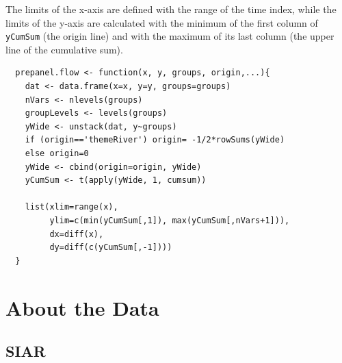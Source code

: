 \documentclass[smallroyalvopaper]{memoir}
\begin{document}
The limits of the x-axis are defined with the range of the time index,
while the limits of the y-axis are calculated with the minimum of the
first column of \texttt{yCumSum} (the origin line) and with the maximum of
its last column (the upper line of the cumulative sum).

\lstset{language=r,label= ,caption= ,captionpos=b,numbers=none}
\begin{lstlisting}
  prepanel.flow <- function(x, y, groups, origin,...){
    dat <- data.frame(x=x, y=y, groups=groups)
    nVars <- nlevels(groups)
    groupLevels <- levels(groups)
    yWide <- unstack(dat, y~groups)
    if (origin=='themeRiver') origin= -1/2*rowSums(yWide)
    else origin=0
    yWide <- cbind(origin=origin, yWide)
    yCumSum <- t(apply(yWide, 1, cumsum))
  
    list(xlim=range(x),
         ylim=c(min(yCumSum[,1]), max(yCumSum[,nVars+1])),
         dx=diff(x),
         dy=diff(c(yCumSum[,-1])))
  }
\end{lstlisting}

\chapter{About the Data}
\label{sec:org02d2fdc}
\label{cha:dataTime}

\section{SIAR}
\label{sec:org0ca2455}
\end{document}
